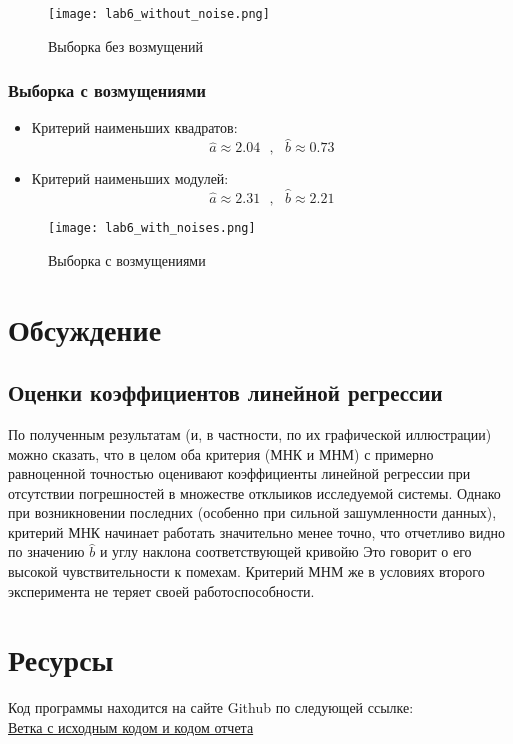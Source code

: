 \documentclass[a4paper]{article}
\begin{document}
        \begin{figure}[H]
            \centering
            \texttt{[image: lab6\_without\_noise.png]}
            \caption{Выборка без возмущений}
            \label{fig:uniform}
        \end{figure}
        
        \subsubsection{Выборка с возмущениями}
        
        \begin{itemize}
            \item Критерий наименьших квадратов:
            \begin{equation} \label{mnk with noises}
                \widehat{a} \approx 2.04 \text{ }, \text{ } \widehat{b} \approx 0.73
            \end{equation}
            
            \item Критерий наименьших модулей:
            \begin{equation} \label{mnm with noises}
                \widehat{a} \approx 2.31 \text{ }, \text{ } \widehat{b} \approx 2.21
            \end{equation}
            
        \end{itemize}
        
        \begin{figure}[H]
            \centering
            \texttt{[image: lab6\_with\_noises.png]}
            \caption{Выборка с возмущениями}
            \label{fig:uniform}
        \end{figure}
        
\section{Обсуждение}
    
    \subsection{Оценки коэффициентов линейной регрессии}
    
        По полученным результатам (и,  в частности, по их графической иллюстрации) можно сказать, что в целом оба критерия (МНК и МНМ) с примерно равноценной точностью оценивают коэффициенты линейной регрессии при отсутствии погрешностей в множестве отклыиков исследуемой системы. Однако при возникновении последних (особенно при сильной зашумленности данных), критерий МНК начинает работать значительно менее точно, что отчетливо видно по значению $\widehat{b}$ и углу наклона соответствующей кривойю Это говорит о его высокой чувствительности к помехам. Критерий МНМ же в условиях второго эксперимента не теряет своей работоспособности.
    
\section{Ресурсы}

    Код программы находится на сайте Github по следующей ссылке: \\
    
    \href{https://github.com/YaroslavAggressive/Mathematical-statistics-lab-works/tree/main}{Ветка с исходным кодом и кодом отчета}
\end{document}
